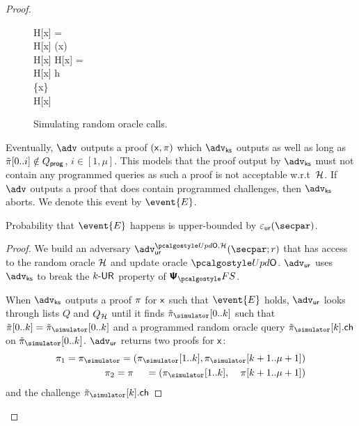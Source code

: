 \begin{proof}
	
	\begin{figure}
		\centering
			\begin{pcvstack}
			\begin{pchstack}
				{
				\pcif H[x] = \bot \pcthen \\
				\pcind H[x] \gets \ro(x) \\
				\pcreturn H[x]
		  		}
				\pchspace
				{ 
					\pcif H[x] = \bot \pcthen \\ 
					\pcind H[x] \gets h \\
					\pcind \Qprog \gets \Qprog \cup \{x\}\\
					\pcreturn H[x]
				}
			\end{pchstack}
		\end{pcvstack}
		\caption{Simulating random oracle calls.}
		\label{fig:simulator_oracles}
	\end{figure}	
%

	Eventually, $\advse$ outputs a proof $(\mathsf{x}, \pi)$ which $\advcss$ outputs as well as long as $\tilde{\pi}[0..i] \notin Q_{\mathsf{prog}}$, $i\in[1,\mu]$. This models that the proof output by $\advcss$ must not contain any programmed queries as such a proof is not acceptable w.r.t~$\mathcal{H}$. If $\advse$ outputs a proof that does contain programmed challenges, then $\advcss$ aborts. We denote this event by $\event{E}$.
	
	\begin{lemma}
		Probability that $\event{E}$ happens is upper-bounded by $\epsur(\secpar)$. 
	\end{lemma}
	\begin{proof}

	We build an adversary $\advur^{\initU, \ro} (\secpar; r)$ that has access to the random oracle $\mathcal{H}$ and update oracle $\initU$. $\advur$ uses $\advcss$ to break the ${k\text{-}\mathsf{UR}}$ property of $\psfs$. 

	When $\advcss$ outputs a proof $\pi$ for $\mathsf{x}$ such that $\event{E}$ holds, $\advur$ looks through lists $Q$ and $Q_{\mathcal{H}}$ until it finds $\tzkproofs[0..k]$ such that $\tzkproof[0..k] = \tzkproofs[0..k]$ and a programmed random oracle query $\tzkproofs[k].\ch$ on $\tzkproofs[0..k]$.	$\advur$ returns two proofs for $\mathsf{x}$:
		\begin{align*}
		\zkproof_1 = \zkproofs =  (\zkproofs[1..k], \zkproofs[k + 1..\mu + 1])\\
		\zkproof_2 = \zkproof \;\;\;\;\, = (\zkproofs[1..k], \;\;\;\;\zkproof[k + 1..\mu + 1])
		\end{align*}
		and the challenge $\tzkproofs[k].\ch$


\end{proof}
\end{proof}
